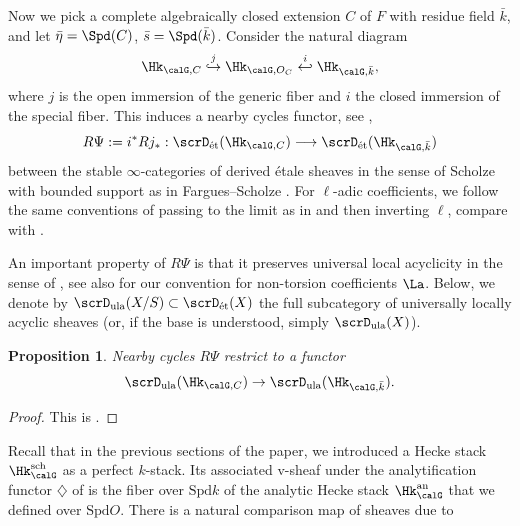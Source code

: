 \documentclass[10pt, reqno]{amsart}
\theoremstyle{plain}
\newtheorem{proposition}[theorem]{Proposition}
\theoremstyle{definition}
\numberwithin{equation}{section}
\begin{document}
	Now we pick a complete algebraically closed extension $C$ of $F$ with residue field $\bar k$, and let $\bar{\eta} = \Spd(C)$, $\bar{s}= \Spd(\bar k)$. 
	Consider the natural diagram
	\begin{equation}
		\Hk_{\calG,C} \overset{j}{\hookrightarrow} \Hk_{\calG,O_C}
		\overset{i}{\hookleftarrow} \Hk_{\calG,\bar k},
	\end{equation}
	where $j$ is the open immersion of the generic fiber and $i$ the closed immersion of the special fiber.
	This induces a nearby cycles functor, see \cite[Section 6.5]{AGLR22},
	\begin{equation}
		R\Psi := i^*Rj_* :  \scrD_{\mathrm{\acute{e}t}}(\Hk_{\calG, C}) \longrightarrow 
		\scrD_{\mathrm{\acute{e}t}}(\Hk_{\calG,\bar k})
	\end{equation}
	between the stable $\infty$-categories of derived étale sheaves in the sense of Scholze \cite[Definition 14.13, Lemma 17.1]{Sch17} with bounded support as in Fargues--Scholze \cite[Chapter VI]{FS21}. For $\ell$-adic coefficients, we follow the same conventions of passing to the limit as in \cite[Section 27]{Sch17} and then inverting $\ell$, compare with \cite[Section 6.5]{AGLR22}. 
	
	An important property of $R\Psi$ is that it preserves universal local acyclicity in the sense of \cite[Section IV.2.1]{FS21}, see also \cite[Section 6]{AGLR22} for our convention for non-torsion coefficients $\La$. Below, we denote by $\scrD_{\mathrm{ula}}(X/S) \subset \scrD_{\mathrm{\acute{e}t}}(X)$ the full subcategory of universally locally acyclic sheaves (or, if the base is understood, simply $\scrD_{\mathrm{ula}}(X)$).
	
	\begin{proposition}\label{prop_nearby_cycles_ula}
		Nearby cycles $R\Psi$ restrict to a functor
		\begin{equation}		\scrD_{\mathrm{ula}}(\Hk_{\calG,C}) \rightarrow 
			\scrD_{\mathrm{ula}}(\Hk_{\calG, \bar k}).
		\end{equation}
	\end{proposition}
	
	\begin{proof}
		This is \cite[Corollary 6.14]{AGLR22}.
	\end{proof}
	
	Recall that in the previous sections of the paper, we introduced a Hecke stack $\Hk_{\calG}^{\mathrm{sch}}$ as a perfect $k$-stack. Its associated v-sheaf under the analytification functor $\diamondsuit$ of \cite[Section 27]{Sch17} is the fiber over $\mathrm{Spd} k$ of the analytic Hecke stack $\Hk_{\calG}^{\mathrm{an}}$ that we defined over $\mathrm{Spd}O$. There is a natural comparison map of sheaves due to \cite[Section 27]{Sch17}
	
\end{document}
